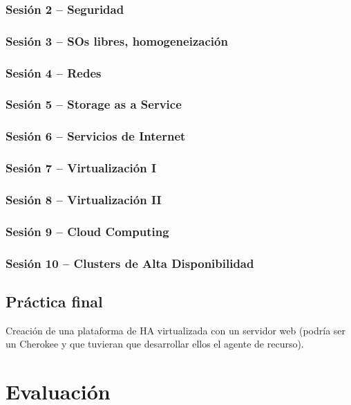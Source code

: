 \documentclass[a4paper]{article}
\begin{document}
      \subsubsection{Sesión 2 -- Seguridad}
      \subsubsection{Sesión 3 -- SOs libres, homogeneización}
      \subsubsection{Sesión 4 -- Redes}
      \subsubsection{Sesión 5 -- Storage as a Service}
      \subsubsection{Sesión 6 -- Servicios de Internet}
      \subsubsection{Sesión 7 -- Virtualización I}
      \subsubsection{Sesión 8 -- Virtualización II}
      \subsubsection{Sesión 9 -- Cloud Computing}
      \subsubsection{Sesión 10 -- Clusters de Alta Disponibilidad}

    \subsection{Práctica final}
      Creación de una plataforma de HA virtualizada con un servidor web (podría ser un Cherokee y que tuvieran que desarrollar ellos el agente de recurso).
      

  \section{Evaluación}
\end{document}
